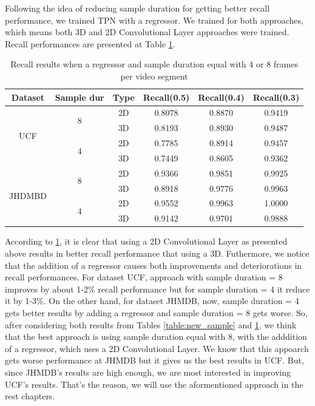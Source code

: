 Following the idea of reducing sample duration for getting better recall performance, we trained TPN with a regressor. We trained for both approaches, which means both 3D and 2D Convolutional
Layer approaches were trained. Recall performances are presented at Table \ref{table:new_sample_reg}.

\begin{table}[h]
  \centering
  \begin{tabular}{|c | c | c || c c c|}
    \hline
    \textbf{Dataset} & \textbf{Sample dur} & \textbf{Type} & \textbf{Recall(0.5)} &  \textbf{Recall(0.4)} &  \textbf{Recall(0.3)} \\
    \hline
    \multirow{4}{*}{UCF} & \multirow{2}{*}{8} & 2D & 0.8078 & 0.8870 & 0.9419 \\
    \cline{3-6}
    {} & {} & 3D & 0.8193 & 0.8930 & 0.9487 \\
    \cline{2-6}
    {} & \multirow{2}{*}{4}& 2D & 0.7785 & 0.8914 & 0.9457 \\
    \cline{3-6}
    {} & {} & 3D & 0.7449 & 0.8605 & 0.9362 \\
    \hline
    \multirow{4}{*}{JHDMBD} & \multirow{2}{*}{8} & 2D &  0.9366 & 0.9851 & 0.9925  \\
    \cline{3-6}
    {} & {} & 3D & 0.8918 & 0.9776 & 0.9963  \\ 
    \cline{2-6}
    {} & \multirow{2}{*}{4}& 2D & 0.9552 & 0.9963 & 1.0000 \\
    \cline{3-6}
    {} & {} & 3D & 0.9142 & 0.9701 & 0.9888  \\
    \hline
    
  \end{tabular}
  \caption{Recall results when a regressor and sample duration equal with 4 or 8 frames per video segment}
  \label{table:new_sample_reg}
\end{table}

According to \ref{table:new_sample_reg}, it is clear that using a 2D Convolutional Layer as presented above results in better recall performance that using a 3D. Futhermore, we notice that
the addition of a regressor causes both improvements and deteriorations in recall performances. For dataset UCF, approach with sample duration = 8 improves by about 1-2\% recall performance
but for sample duration = 4 it reduce it by 1-3\%. On the other hand, for dataset JHMDB, now, sample duration = 4 gets better results by adding a regressor and sample duration = 8 gets
worse. So, after considering both results from Tables \ref{table:new_sample} and \ref{table:new_sample_reg}, we think that the best approach is using sample duration equal with 8, with the
adddition of a regressor, which uses a 2D Convolutional Layer. We know that this appoarch gets worse performance at JHMDB but it gives us the best results in UCF. But, since JHMDB's results are
high enough, we are most interested in improving UCF's results. That's the reason, we will use the aformentioned approach in the rest chapters.

